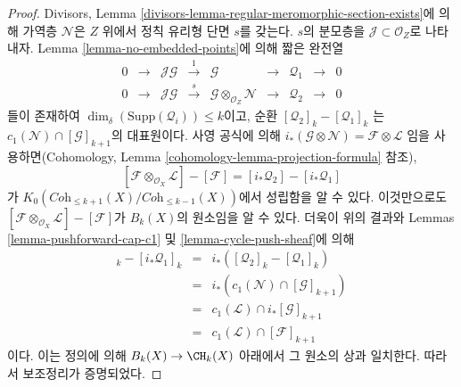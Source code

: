 \begin{proof}
\medskip\noindent
Divisors, Lemma \ref{divisors-lemma-regular-meromorphic-section-exists}에
의해 가역층 $\mathcal{N}$은 $Z$ 위에서 정칙 유리형 단면 $s$를
갖는다. $s$의 분모층을 $\mathcal{J} \subset \mathcal{O}_Z$로
나타내자. Lemma \ref{lemma-no-embedded-points}에 의해 짧은 완전열
$$
\begin{matrix}
0 &
\to &
\mathcal{J}\mathcal{G} &
\xrightarrow{1} &
\mathcal{G} &
\to &
\mathcal{Q}_1 &
\to &
0 \\
0 &
\to &
\mathcal{J}\mathcal{G} &
\xrightarrow{s} &
\mathcal{G} \otimes_{\mathcal{O}_Z} \mathcal{N} &
\to &
\mathcal{Q}_2 &
\to &
0
\end{matrix}
$$
들이 존재하여 $\dim_\delta(\text{Supp}(\mathcal{Q}_i)) \leq k$이고,
순환
$
[\mathcal{Q}_2]_k - [\mathcal{Q}_1]_k
$
는 $c_1(\mathcal{N}) \cap [\mathcal{G}]_{k + 1}$의 대표원이다.
사영 공식에 의해
$i_*(\mathcal{G} \otimes \mathcal{N}) = \mathcal{F} \otimes \mathcal{L}$
임을 사용하면(Cohomology, Lemma
\ref{cohomology-lemma-projection-formula} 참조),
$$
[\mathcal{F} \otimes_{\mathcal{O}_X} \mathcal{L}]
-
[\mathcal{F}]
=
[i_*\mathcal{Q}_2] - [i_*\mathcal{Q}_1]
$$
가 $K_0(\textit{Coh}_{\leq k + 1}(X)/\textit{Coh}_{\leq k - 1}(X))$에서
성립함을 알 수 있다. 이것만으로도
$[\mathcal{F} \otimes_{\mathcal{O}_X} \mathcal{L}] - [\mathcal{F}]$가
$B_k(X)$의 원소임을 알 수 있다. 더욱이 위의 결과와 Lemmas
\ref{lemma-pushforward-cap-c1} 및 \ref{lemma-cycle-push-sheaf}에 의해
\begin{eqnarray*}
[i_*\mathcal{Q}_2]_k - [i_*\mathcal{Q}_1]_k
& = &
i_*\left( [\mathcal{Q}_2]_k - [\mathcal{Q}_1]_k \right) \\
& = &
i_*\left(c_1(\mathcal{N}) \cap [\mathcal{G}]_{k + 1} \right) \\
& = &
c_1(\mathcal{L}) \cap i_*[\mathcal{G}]_{k + 1} \\
& = &
c_1(\mathcal{L}) \cap [\mathcal{F}]_{k + 1}
\end{eqnarray*}
이다. 이는 정의에 의해 $B_k(X) \to \CH_k(X)$ 아래에서 그 원소의
상과 일치한다. 따라서 보조정리가 증명되었다.
\end{proof}








































